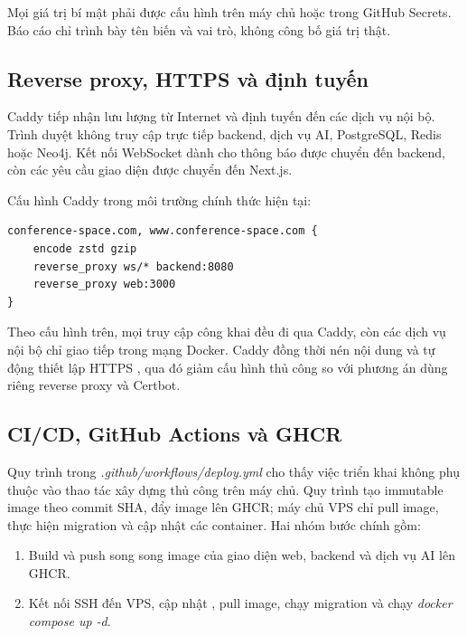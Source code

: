Mọi giá trị bí mật phải được cấu hình trên máy chủ hoặc trong GitHub Secrets. Báo cáo chỉ trình bày tên biến và vai trò, không công bố giá trị thật.

\subsection{Reverse proxy, HTTPS và định tuyến}

Caddy tiếp nhận lưu lượng từ Internet và định tuyến đến các dịch vụ nội bộ. Trình duyệt không truy cập trực tiếp backend, dịch vụ AI, PostgreSQL, Redis hoặc Neo4j. Kết nối WebSocket dành cho thông báo được chuyển đến backend, còn các yêu cầu giao diện được chuyển đến Next.js.

Cấu hình Caddy trong môi trường chính thức hiện tại:

\begin{lstlisting}
conference-space.com, www.conference-space.com {
    encode zstd gzip
    reverse_proxy ws/* backend:8080
    reverse_proxy web:3000
}
\end{lstlisting}

Theo cấu hình trên, mọi truy cập công khai đều đi qua Caddy, còn các dịch vụ nội bộ chỉ giao tiếp trong mạng Docker. Caddy đồng thời nén nội dung và tự động thiết lập HTTPS \cite{ch3ref19}, qua đó giảm cấu hình thủ công so với phương án dùng riêng reverse proxy và Certbot.

\subsection{CI/CD, GitHub Actions và GHCR}

Quy trình trong \textit{.github/workflows/deploy.yml} cho thấy việc triển khai không phụ thuộc vào thao tác xây dựng thủ công trên máy chủ. Quy trình tạo immutable image theo commit SHA, đẩy image lên GHCR; máy chủ VPS chỉ pull image, thực hiện migration và cập nhật các container. Hai nhóm bước chính gồm:

\begin{enumerate}
  \item Build và push song song image của giao diện web, backend và dịch vụ AI lên GHCR.
  \item Kết nối SSH đến VPS, cập nhật , pull image, chạy migration và chạy \textit{docker compose up -d}.
\end{enumerate}


